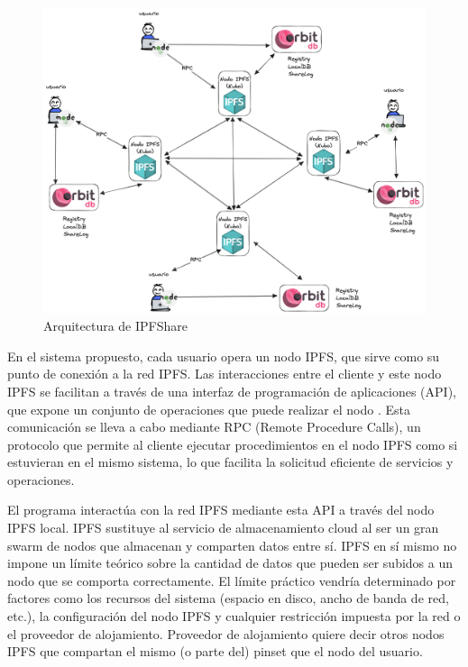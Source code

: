 \begin{figure}[H]
  \centering
  \includegraphics[width=\textwidth]{images/ipfshare-architecture.png}
  \caption{Arquitectura de IPFShare}
  \label{fig:ipfsharearch}
\end{figure}

En el sistema propuesto, cada usuario opera un nodo IPFS, que sirve como su punto de conexión a la red IPFS. Las interacciones entre el cliente y
este nodo IPFS se facilitan a través de una interfaz de programación de aplicaciones (API), que expone un conjunto de operaciones que puede realizar
el nodo \cite{KuboRPCAPI}. Esta comunicación se lleva a cabo mediante RPC (Remote Procedure Calls), un protocolo que permite al cliente ejecutar procedimientos en el nodo IPFS como si estuvieran en el mismo sistema, lo que facilita la solicitud eficiente de servicios y operaciones.

El programa interactúa con la red IPFS mediante esta API a través del nodo IPFS local. IPFS sustituye al servicio de almacenamiento cloud
al ser un gran swarm de nodos que almacenan y comparten datos entre sí. IPFS en sí mismo no impone un límite teórico sobre la cantidad de datos que
pueden ser subidos a un nodo que se comporta correctamente. El límite práctico vendría determinado por factores como los recursos del sistema (espacio en
disco, ancho de banda de red, etc.), la configuración del nodo IPFS y cualquier restricción impuesta por la red o el proveedor de alojamiento. Proveedor
de alojamiento quiere decir otros nodos IPFS que compartan el mismo (o parte del) pinset que el nodo del usuario.

